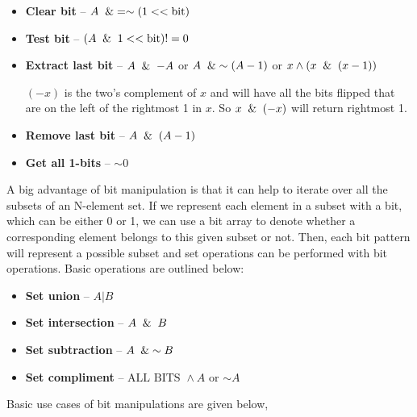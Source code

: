 \documentclass{article}
\begin{document}
\begin{itemize}
        \item \textbf{Clear bit} -- $A \And = \sim (1 << \text{bit})$
        \item \textbf{Test bit} -- $(A \And 1 << \text{bit}) != 0$
        \item \textbf{Extract last bit} -- $A\And-A$ or $A \And \sim (A-1)$ or $x\wedge (x \And (x -1))$
        
        $(-x)$ is the two’s complement of $x$ and will have all the bits flipped that are on the left of the rightmost 1 in $x$. So $x \And (-x)$ will return rightmost 1.
        
        \item \textbf{Remove last bit} -- $A \And (A-1)$
        \item \textbf{Get all 1-bits} -- $\sim 0$
        
    \end{itemize}
    
    A big advantage of bit manipulation is that it can help to iterate over all the subsets of an N-element set. If we represent each element in a subset with a bit, which can be either 0 or 1, we can use a bit array to denote whether a corresponding element belongs to this given subset or not. Then, each bit pattern will represent a possible subset and set operations can be performed with bit operations. Basic operations are outlined below:
    
    \begin{itemize}
        \item \textbf{Set union} -- $A \vert B$
        \item \textbf{Set intersection} -- $A \And B$
        \item \textbf{Set subtraction} -- $A \And \sim B$
        \item \textbf{Set compliment} -- $\text{ALL BITS } \wedge A$ or $\sim A$
    \end{itemize}
    
    Basic use cases of bit manipulations are given below,
    
\end{document}
